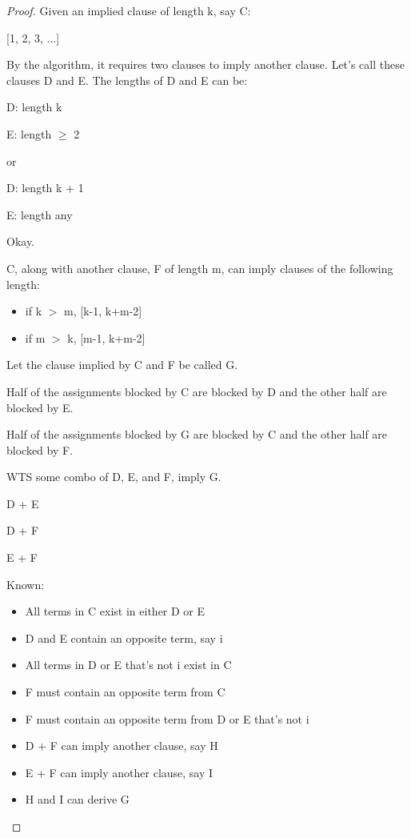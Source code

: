 \documentclass[manuscript]{acmart}
\begin{document}
    \begin{proof}
        Given an implied clause of length k, say C:

        [1, 2, 3, ...]

        By the algorithm, it requires two clauses to imply another clause.
        Let's call these clauses D and E. The lengths of D and E can be:

        D: length k
        
        E: length $\geq$ 2

        or

        D: length k + 1
        
        E: length any

        Okay.

        C, along with another clause, F of length m, can imply clauses of the following length:

        \begin{itemize}
            \item if k $>$ m, [k-1, k+m-2]
            \item if m $>$ k, [m-1, k+m-2] 
        \end{itemize}

        Let the clause implied by C and F be called G.
        
        Half of the assignments blocked by C are blocked by D and the 
        other half are blocked by E.

        Half of the assignments blocked by G are blocked by C and the
        other half are blocked by F.

        WTS some combo of D, E, and F, imply G.

        D + E

        D + F

        E + F

        Known:
        \begin{itemize}
            \item All terms in C exist in either D or E
            \item D and E contain an opposite term, say i
            \item All terms in D or E that's not i exist in C
            \item F must contain an opposite term from C
            \item F must contain an opposite term from D or E that's not i 
            \item D + F can imply another clause, say H
            \item E + F can imply another clause, say I
            \item H and I can derive G
        \end{itemize}
        

\end{proof}
\end{document}
